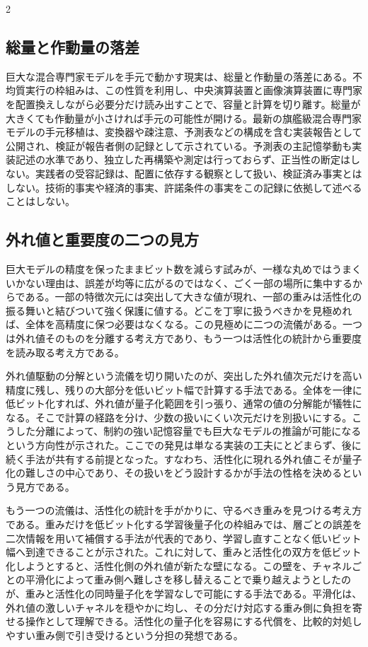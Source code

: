 \documentclass[lualatex,a4paper,10pt]{jlreq}
\begin{document}
\begin{multicols}{2}
\subsection{総量と作動量の落差}
巨大な混合専門家モデルを手元で動かす現実は、総量と作動量の落差にある。不均質実行の枠組みは、この性質を利用し、中央演算装置と画像演算装置に専門家を配置換えしながら必要分だけ読み出すことで、容量と計算を切り離す\autocite{ktransformers}。総量が大きくても作動量が小さければ手元の可能性が開ける。最新の旗艦級混合専門家モデルの手元移植は、変換器や疎注意、予測表などの構成を含む実装報告として公開され、検証が報告者側の記録として示されている\autocite{qwenpr}。予測表の主記憶挙動も実装記述の水準であり、独立した再構築や測定は行っておらず、正当性の断定はしない。実践者の受容記録は、配置に依存する観察として扱い、検証済み事実とはしない。技術的事実や経済的事実、許諾条件の事実をこの記録に依拠して述べることはしない。

\subsection{外れ値と重要度の二つの見方}
巨大モデルの精度を保ったままビット数を減らす試みが、一様な丸めではうまくいかない理由は、誤差が均等に広がるのではなく、ごく一部の場所に集中するからである。一部の特徴次元には突出して大きな値が現れ、一部の重みは活性化の振る舞いと結びついて強く保護に値する。どこを丁寧に扱うべきかを見極めれば、全体を高精度に保つ必要はなくなる。この見極めに二つの流儀がある。一つは外れ値そのものを分離する考え方であり、もう一つは活性化の統計から重要度を読み取る考え方である\autocite{llmint8}\autocite{smoothquant}\autocite{awq}。

外れ値駆動の分解という流儀を切り開いたのが、突出した外れ値次元だけを高い精度に残し、残りの大部分を低いビット幅で計算する手法である\autocite{llmint8}。全体を一律に低ビット化すれば、外れ値が量子化範囲を引っ張り、通常の値の分解能が犠牲になる。そこで計算の経路を分け、少数の扱いにくい次元だけを別扱いにする。こうした分離によって、制約の強い記憶容量でも巨大なモデルの推論が可能になるという方向性が示された。ここでの発見は単なる実装の工夫にとどまらず、後に続く手法が共有する前提となった。すなわち、活性化に現れる外れ値こそが量子化の難しさの中心であり、その扱いをどう設計するかが手法の性格を決めるという見方である。

もう一つの流儀は、活性化の統計を手がかりに、守るべき重みを見つける考え方である。重みだけを低ビット化する学習後量子化の枠組みでは、層ごとの誤差を二次情報を用いて補償する手法が代表的であり、学習し直すことなく低いビット幅へ到達できることが示された\autocite{gptq}。これに対して、重みと活性化の双方を低ビット化しようとすると、活性化側の外れ値が新たな壁になる。この壁を、チャネルごとの平滑化によって重み側へ難しさを移し替えることで乗り越えようとしたのが、重みと活性化の同時量子化を学習なしで可能にする手法である\autocite{smoothquant}。平滑化は、外れ値の激しいチャネルを穏やかに均し、その分だけ対応する重み側に負担を寄せる操作として理解できる。活性化の量子化を容易にする代償を、比較的対処しやすい重み側で引き受けるという分担の発想である。


\end{multicols}
\end{document}
